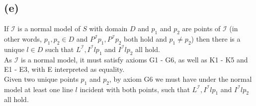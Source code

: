 \documentclass[11pt,oneside,a4paper]{article}
\begin{document}
\subsection*{(e)}
If $\mathcal{I}$ is a normal model of $S$ with domain $D$ and $p_1$ and $p_2$ are points of $\mathcal{I}$ (in other words, $p_1, p_2 \in D$ and $P^\mathcal{I}p_1, P^\mathcal{I}p_2$ both hold and $p_1 \neq p_2$) then there is a unique $l \in D$ such that
$L^\mathcal{I}, I^\mathcal{I}lp_1$ and $I^\mathcal{I}lp_2$ all hold.\\
As $\mathcal{I}$ is a normal model, it must satisfy axioms G1 - G6, as well as K1 - K5 and E1 - E3, with E interpreted as equality. \\
Given two unique points $p_1$ and $p_2$, by axiom G6 we must have under the normal model at least one line $l$ incident with both points, such that $L^\mathcal{I}, I^\mathcal{I}lp_1$ and $I^\mathcal{I}lp_2$ all hold.
\end{document}
